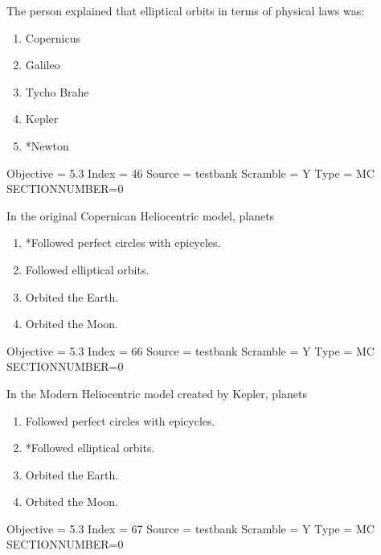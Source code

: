 \documentclass[11pt]{article}
\begin{document}
\begin{enumerate}
\begin{minipage}{\textwidth}
\begin{minipage}{\textwidth}
\item The person explained that elliptical orbits in terms of physical laws was:
\begin{multicols}{3}
\begin{enumerate} 
\setlength{\itemsep}{1pt} 
\setlength{\parskip}{0pt} 
\setlength{\parsep}{0pt}
\setlength{\multicolsep}{1pt} 
\item Copernicus
\item Galileo
\item Tycho Brahe
\item Kepler
\item *Newton
\end{enumerate} 
\vfill 
\end{multicols}

Objective = 5.3
Index = 46
Source = testbank
Scramble = Y
Type = MC
SECTIONNUMBER=0
\end{minipage}
\end{minipage}
\vskip 0.20in

\begin{minipage}{\textwidth}
\begin{minipage}{\textwidth}
\item In the original Copernican Heliocentric model, planets
\begin{enumerate} 
\setlength{\itemsep}{1pt} 
\setlength{\parskip}{0pt} 
\setlength{\parsep}{0pt}
\setlength{\multicolsep}{1pt} 
\item *Followed perfect circles with epicycles.
\item Followed elliptical orbits.
\item Orbited the Earth.
\item Orbited the Moon.
\end{enumerate} 
Objective = 5.3
Index = 66
Source = testbank
Scramble = Y
Type = MC
SECTIONNUMBER=0
\end{minipage}
\end{minipage}
\vskip 0.20in

\begin{minipage}{\textwidth}
\begin{minipage}{\textwidth}
\item In the Modern Heliocentric model created by Kepler, planets
\begin{enumerate} 
\setlength{\itemsep}{1pt} 
\setlength{\parskip}{0pt} 
\setlength{\parsep}{0pt}
\setlength{\multicolsep}{1pt} 
\item Followed perfect circles with epicycles.
\item *Followed elliptical orbits.
\item Orbited the Earth.
\item Orbited the Moon.
\end{enumerate} 
Objective = 5.3
Index = 67
Source = testbank
Scramble = Y
Type = MC
SECTIONNUMBER=0
\end{minipage}
\end{minipage}
\vskip 0.20in


\end{enumerate}
\end{document}
